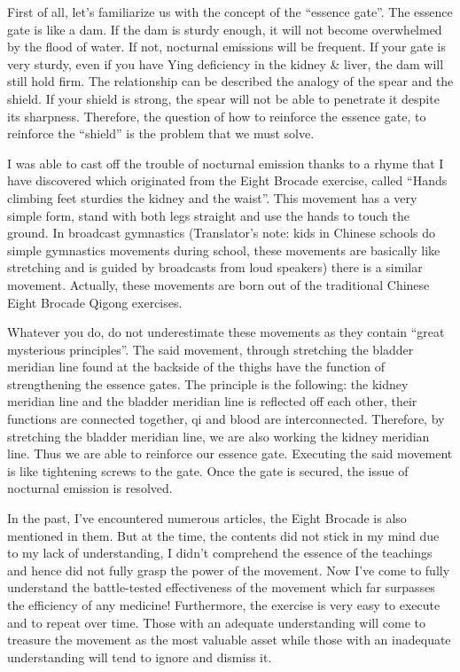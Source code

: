 \documentclass[
]{book}
\begin{document}
First of all, let's familiarize us with the concept of the ``essence gate''. The essence gate is like a dam. If the dam is sturdy enough, it will not become overwhelmed by the flood of water. If not, nocturnal emissions will be frequent. If your gate is very sturdy, even if you have Ying deficiency in the kidney \& liver, the dam will still hold firm. The relationship can be described the analogy of the spear and the shield. If your shield is strong, the spear will not be able to penetrate it despite its sharpness. Therefore, the question of how to reinforce the essence gate, to reinforce the ``shield'' is the problem that we must solve.

I was able to cast off the trouble of nocturnal emission thanks to a rhyme that I have discovered which originated from the Eight Brocade exercise, called ``Hands climbing feet sturdies the kidney and the waist''. This movement has a very simple form, stand with both legs straight and use the hands to touch the ground. In broadcast gymnastics (Translator's note: kids in Chinese schools do simple gymnastics movements during school, these movements are basically like stretching and is guided by broadcasts from loud speakers) there is a similar movement. Actually, these movements are born out of the traditional Chinese Eight Brocade Qigong exercises.

Whatever you do, do not underestimate these movements as they contain ``great mysterious principles''. The said movement, through stretching the bladder meridian line found at the backside of the thighs have the function of strengthening the essence gates. The principle is the following: the kidney meridian line and the bladder meridian line is reflected off each other, their functions are connected together, qi and blood are interconnected. Therefore, by stretching the bladder meridian line, we are also working the kidney meridian line. Thus we are able to reinforce our essence gate. Executing the said movement is like tightening screws to the gate. Once the gate is secured, the issue of nocturnal emission is resolved.

In the past, I've encountered numerous articles, the Eight Brocade is also mentioned in them. But at the time, the contents did not stick in my mind due to my lack of understanding, I didn't comprehend the essence of the teachings and hence did not fully grasp the power of the movement. Now I've come to fully understand the battle-tested effectiveness of the movement which far surpasses the efficiency of any medicine! Furthermore, the exercise is very easy to execute and to repeat over time. Those with an adequate understanding will come to treasure the movement as the most valuable asset while those with an inadequate understanding will tend to ignore and dismiss it.
\end{document}
